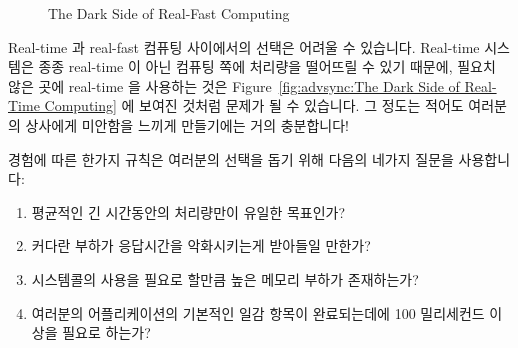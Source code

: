 \begin{figure}[tb]
\centering
{}
\caption{The Dark Side of Real-Fast Computing}
\end{figure}

Real-time 과 real-fast 컴퓨팅 사이에서의 선택은 어려울 수 있습니다.
Real-time 시스템은 종종 real-time 이 아닌 컴퓨팅 쪽에 처리량을 떨어뜨릴 수 있기
때문에, 필요치 않은 곳에 real-time 을 사용하는 것은
Figure~\ref{fig:advsync:The Dark Side of Real-Time Computing} 에 보여진 것처럼
문제가 될 수 있습니다.
그 정도는 적어도 여러분의 상사에게 미안함을 느끼게 만들기에는 거의 충분합니다!

경험에 따른 한가지 규칙은 여러분의 선택을 돕기 위해 다음의 네가지 질문을
사용합니다:

\begin{enumerate}
\item	평균적인 긴 시간동안의 처리량만이 유일한 목표인가?
\item	커다란 부하가 응답시간을 악화시키는게 받아들일 만한가?
\item	{} 시스템콜의 사용을 필요로 할만큼 높은 메모리 부하가
	존재하는가?
\item	여러분의 어플리케이션의 기본적인 일감 항목이 완료되는데에 100
	밀리세컨드 이상을 필요로 하는가?

\end{enumerate}

